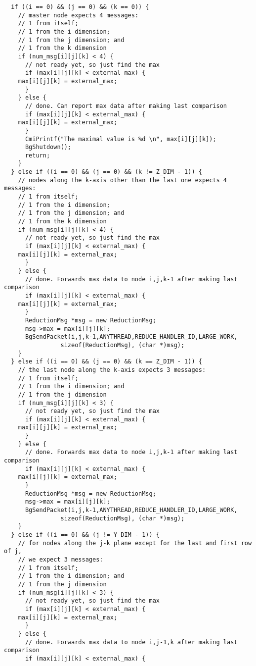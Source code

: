 \begin{verbatim}
  if ((i == 0) && (j == 0) && (k == 0)) {
    // master node expects 4 messages:
    // 1 from itself;
    // 1 from the i dimension;
    // 1 from the j dimension; and
    // 1 from the k dimension
    if (num_msg[i][j][k] < 4) {
      // not ready yet, so just find the max
      if (max[i][j][k] < external_max) {
	max[i][j][k] = external_max;
      }
    } else {
      // done. Can report max data after making last comparison
      if (max[i][j][k] < external_max) {
	max[i][j][k] = external_max;
      }
      CmiPrintf("The maximal value is %d \n", max[i][j][k]);
      BgShutdown();
      return;
    }
  } else if ((i == 0) && (j == 0) && (k != Z_DIM - 1)) {
    // nodes along the k-axis other than the last one expects 4 messages:
    // 1 from itself;
    // 1 from the i dimension;
    // 1 from the j dimension; and
    // 1 from the k dimension
    if (num_msg[i][j][k] < 4) {
      // not ready yet, so just find the max
      if (max[i][j][k] < external_max) {
	max[i][j][k] = external_max;
      }
    } else {
      // done. Forwards max data to node i,j,k-1 after making last comparison
      if (max[i][j][k] < external_max) {
	max[i][j][k] = external_max;
      }
      ReductionMsg *msg = new ReductionMsg;
      msg->max = max[i][j][k];
      BgSendPacket(i,j,k-1,ANYTHREAD,REDUCE_HANDLER_ID,LARGE_WORK, 
				sizeof(ReductionMsg), (char *)msg);
    }
  } else if ((i == 0) && (j == 0) && (k == Z_DIM - 1)) {
    // the last node along the k-axis expects 3 messages:
    // 1 from itself;
    // 1 from the i dimension; and
    // 1 from the j dimension
    if (num_msg[i][j][k] < 3) {
      // not ready yet, so just find the max
      if (max[i][j][k] < external_max) {
	max[i][j][k] = external_max;
      }
    } else {
      // done. Forwards max data to node i,j,k-1 after making last comparison
      if (max[i][j][k] < external_max) {
	max[i][j][k] = external_max;
      }
      ReductionMsg *msg = new ReductionMsg;
      msg->max = max[i][j][k];
      BgSendPacket(i,j,k-1,ANYTHREAD,REDUCE_HANDLER_ID,LARGE_WORK, 
				sizeof(ReductionMsg), (char *)msg);
    }
  } else if ((i == 0) && (j != Y_DIM - 1)) {
    // for nodes along the j-k plane except for the last and first row of j,
    // we expect 3 messages:
    // 1 from itself;
    // 1 from the i dimension; and
    // 1 from the j dimension
    if (num_msg[i][j][k] < 3) {
      // not ready yet, so just find the max
      if (max[i][j][k] < external_max) {
	max[i][j][k] = external_max;
      }
    } else {
      // done. Forwards max data to node i,j-1,k after making last comparison
      if (max[i][j][k] < external_max) {

\end{verbatim}
